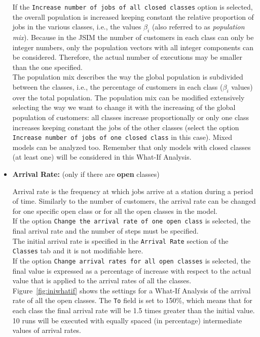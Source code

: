 \begin{itemize}
If the \texttt{Increase number of jobs of all closed classes}
option is selected, the overall population is increased keeping
constant the relative proportion of jobs in the various classes,
i.e., the values $\beta_i$ (also referred to as \emph{population
mix}). Because in the JSIM the number of customers in each class
can only be integer numbers, only the population vectors with all
integer components can be considered. Therefore, the actual number
of executions may be
smaller than the one specified.\\
The population mix describes the way the global population is
subdivided between the classes, i.e., the percentage of customers
in each class ($\beta_i$ values) over the total population. The
population mix can be modified extensively selecting the way we
want to change it with the increasing of the global population of
customers: all classes increase proportionally or only one class
increases keeping constant the jobs of the other classes (select
the option \texttt{Increase number of jobs of one closed class} in
this case). Mixed models can be analyzed too. Remember that only
models with closed classes (at least one) will be considered in
this What-If Analysis.

\item \textbf{Arrival Rate:} (only if there are \textbf{open}
classes)

Arrival rate is the frequency at which jobs arrive at a station
during a period of time. Similarly to the number of customers, the
arrival rate can be changed for one specific open class or for all
the open classes in the model.\\ If the option \texttt{Change the
arrival rate of one open class} is selected, the final arrival
rate and the number of steps must be specified.\\
The initial arrival rate is specified in the \texttt{Arrival Rate}
section of the \texttt{Classes} tab and it is not modifiable
here.\\
If the option \texttt{Change arrival rates for all open classes}
is selected, the final value is expressed as a percentage of
increase with respect to the actual value that is applied to the
arrival rates of all the classes.
Figure~\ref{fig:iniwhatif} shows the settings for a What-If
Analysis of the arrival rate of all the open classes. The
\texttt{To} field is set to 150\%, which means that for each class
the final arrival rate will be 1.5 times greater than the initial
value. 10 runs will be executed with equally spaced (in
percentage) intermediate values of arrival rates.


\end{itemize}
